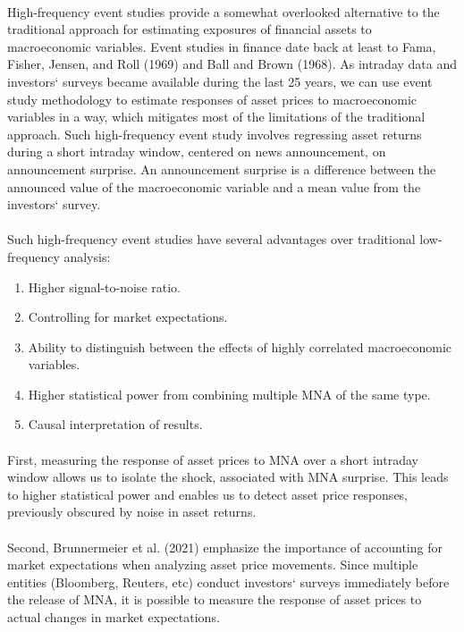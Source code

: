 \documentclass[12pt]{article}
\begin{document}
\paragraph{}
High-frequency event studies provide a somewhat overlooked alternative to the traditional approach for estimating exposures of financial assets to macroeconomic variables. Event studies in finance date back at least to Fama, Fisher, Jensen, and Roll (1969) and Ball and Brown (1968). As intraday data and investors` surveys became available during the last 25 years, we can use event study methodology to estimate responses of asset prices to macroeconomic variables in a way, which mitigates most of the limitations of the traditional approach. Such high-frequency event study involves regressing asset returns during a short intraday window, centered on news announcement, on announcement surprise. An announcement surprise is a difference between the announced value of the macroeconomic variable and a mean value from the investors` survey. 
\paragraph{}
Such high-frequency event studies have several advantages over traditional low-frequency analysis:
\begin{enumerate}
    \item {Higher signal-to-noise ratio.}
    \item {Controlling for market expectations.}
    \item {Ability to distinguish between the effects of highly correlated macroeconomic variables.}
    \item {Higher statistical power from combining multiple MNA of the same type. }
    \item {Causal interpretation of results.}
\end{enumerate}
\paragraph{}
First, measuring the response of asset prices to MNA over a short intraday window allows us to isolate the shock, associated with MNA surprise. This leads to higher statistical power and enables us to detect asset price responses, previously obscured by noise in asset returns. 
\paragraph{}
Second, Brunnermeier et al. (2021) emphasize the importance of accounting for market expectations when analyzing asset price movements. Since multiple entities (Bloomberg, Reuters, etc) conduct investors` surveys immediately before the release of MNA, it is possible to measure the response of asset prices to actual changes in market expectations.
\end{document}
